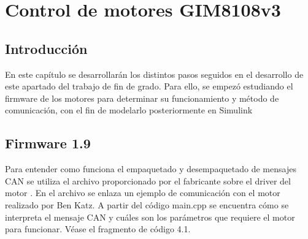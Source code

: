 \chapter{Control de motores GIM8108v3}

\thispagestyle{plain}
\renewcommand{\tablename}{Tabla}

\section{Introducción}

En este capítulo se desarrollarán los distintos pasos seguidos en el desarrollo de este apartado del trabajo de fin de grado. Para ello, se empezó estudiando el firmware de los motores para determinar su funcionamiento y método de comunicación, con el fin de modelarlo posteriormente en Simulink

\section{Firmware 1.9}

Para entender como funciona el empaquetado y desempaquetado de mensajes CAN se utiliza el archivo proporcionado por el fabricante sobre el driver del motor \cite{Katz2021}. En el archivo se enlaza un ejemplo de comunicación con el motor realizado por Ben Katz. A partir del código main.cpp se encuentra cómo se interpreta el mensaje CAN y cuáles son los parámetros que requiere el motor para funcionar. Véase el fragmento de código 4.1.

